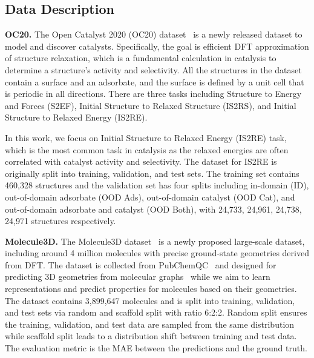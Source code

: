 \documentclass{article}
\begin{document}
\subsection{Data Description} \label{sec:data}

\textbf{OC20.} The Open Catalyst 2020 (OC20) dataset~\cite{chanussot2021open} is a newly released dataset to model and discover catalysts.
Specifically, the goal is efficient DFT approximation of structure relaxation, 
which is a fundamental calculation in catalysis to determine a structure's activity and selectivity.
All the structures in the dataset contain a surface and an adsorbate, 
and the surface is defined by a unit cell that is periodic in all directions.
There are three tasks including 
Structure to Energy and Forces (S2EF),
Initial Structure to Relaxed Structure (IS2RS), 
and Initial Structure to Relaxed Energy (IS2RE).

In this work, we focus on Initial Structure to Relaxed Energy (IS2RE) task, which is the most common task in catalysis 
as the relaxed energies are often correlated with catalyst activity and selectivity. 
The dataset for IS2RE is originally split into training, validation, and test sets.
The training set contains 460,328 structures and the validation set has four splits including 
in-domain (ID), out-of-domain adsorbate (OOD Ads), out-of-domain catalyst (OOD Cat), and out-of-domain adsorbate and catalyst (OOD Both), 
with 24,733, 24,961, 24,738, 24,971 structures respectively.

\textbf{Molecule3D.} The Molecule3D dataset~\cite{xu2021molecule3d} is a newly proposed large-scale dataset, including around 4 million molecules with precise ground-state geometries derived from DFT. 
The dataset is collected from PubChemQC~\cite{nakata2017pubchemqc} and designed for predicting 3D geometries from molecular graphs~\cite{xu2021molecule3d} while 
we aim to learn representations and predict properties for molecules based on their geometries.
The dataset contains 3,899,647 molecules and is split into training, validation, and test sets via random and scaffold split with ratio 6:2:2. 
Random split ensures the training, validation, and test data are sampled from the same distribution while 
scaffold split leads to a distribution shift between training and test data.
The evaluation metric is the MAE between the predictions and the ground truth.
\end{document}
